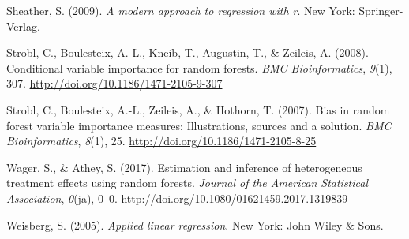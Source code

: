 \documentclass[12pt,twoside]{reedthesis}
\theoremstyle{definition}
\theoremstyle{definition}
\theoremstyle{definition}
\theoremstyle{remark}
\begin{document}
\hypertarget{ref-sheather2009}{}
Sheather, S. (2009). \emph{A modern approach to regression with r}. New
York: Springer-Verlag.

\hypertarget{ref-strobl2008}{}
Strobl, C., Boulesteix, A.-L., Kneib, T., Augustin, T., \& Zeileis, A.
(2008). Conditional variable importance for random forests. \emph{BMC
Bioinformatics}, \emph{9}(1), 307.
\url{http://doi.org/10.1186/1471-2105-9-307}

\hypertarget{ref-strobl2007}{}
Strobl, C., Boulesteix, A.-L., Zeileis, A., \& Hothorn, T. (2007). Bias
in random forest variable importance measures: Illustrations, sources
and a solution. \emph{BMC Bioinformatics}, \emph{8}(1), 25.
\url{http://doi.org/10.1186/1471-2105-8-25}

\hypertarget{ref-wager2017}{}
Wager, S., \& Athey, S. (2017). Estimation and inference of
heterogeneous treatment effects using random forests. \emph{Journal of
the American Statistical Association}, \emph{0}(ja), 0--0.
\url{http://doi.org/10.1080/01621459.2017.1319839}

\hypertarget{ref-weisberg2005}{}
Weisberg, S. (2005). \emph{Applied linear regression}. New York: John
Wiley \& Sons.


\end{document}
